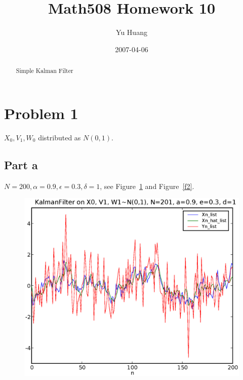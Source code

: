 \documentclass[a4paper,10pt]{article}
\title{Math508 Homework 10}
\author{Yu Huang}
\date{2007-04-06}
\begin{document}
\maketitle

\begin{abstract}
Simple Kalman Filter
\end{abstract}

\section{Problem 1}
$X_0, V_1, W_0$ distributed as $N(0,1)$.

\subsection{Part a}
$N=200, \alpha=0.9, \epsilon=0.3, \delta=1$, see Figure~\ref{f1} and Figure~\ref{f2}.

\begin{figure}
\includegraphics[width=1\textwidth]{hw10_1_N_201_a_0.9_e_0.3_d_1.eps}
\caption{}\label{f1}
\end{figure}
\end{document}
